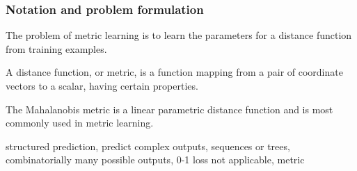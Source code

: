 \documentclass[a4paper,titlepage]{article}
\renewcommand{\vec}[1]{\mathbf{#1}}
\newcommand{\mat}[1]{\mathbf{#1}}
\begin{document}

\subsubsection{Notation and problem formulation}

The problem of metric learning is to learn the parameters for a distance function from training examples.

A distance function, or metric, is a function mapping from a pair of coordinate vectors to a scalar, having certain properties.

The Mahalanobis metric is a linear parametric distance function and is most commonly used in metric learning.



structured prediction, predict complex outputs, sequences or trees, combinatorially many possible outputs, 0-1 loss not applicable, metric 

\end{document}

